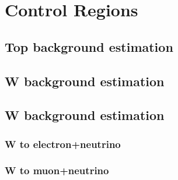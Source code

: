\section{Control Regions}

\subsection{Top background estimation}

\subsection{W background estimation}

\subsection{W background estimation}

\subsubsection{W to electron+neutrino}

\subsubsection{W to muon+neutrino}

